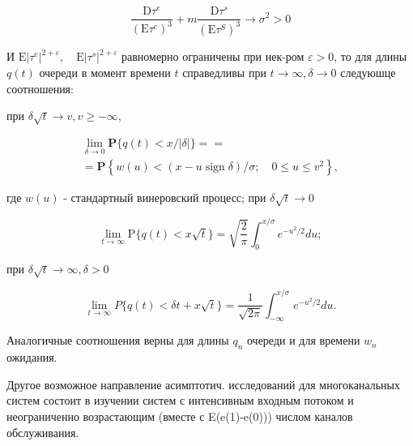 \documentclass[10pt]{article}
\begin{document}
\[

\frac{\mathrm{D} \tau^{e}}{\left(\mathrm{E} \tau^{e}\right)^{3}}+m \frac{\mathrm{D} \tau^{s}}{\left(\mathrm{E} \tau^{S}\right)^{3}} \longrightarrow \sigma^{2}>0

\]



И $\mathrm{E}\left|\tau^{e}\right|^{2+\varepsilon}, \quad \mathrm{E}\left|\tau^{s}\right|^{2+\varepsilon}$ равномерно ограничены при нек-ром $\varepsilon>0$, то для длины $q(t)$ очереди в момент времени $t$ справедливы при $t \rightarrow \infty, \delta \rightarrow 0$ следуюшце соотношения:



при $\delta \sqrt{t} \rightarrow v, v \geqslant-\infty$,



\[

\begin{gathered}

\lim _{\delta \rightarrow 0} \mathbf{P}\{q(t)<x /|\delta|\}== \\

=\mathbf{P}\left\{w(u)<(x-u \operatorname{sign} \delta) / \sigma ; \quad 0 \leqslant u \leqslant v^{2}\right\},

\end{gathered}

\]



где $w(u)$ - стандартный винеровский процесс; при $\delta \sqrt{t} \longrightarrow 0$



\[

\lim _{t \rightarrow \infty} \mathrm{P}\{q(t)<x \sqrt{t}\}=\sqrt{\frac{2}{\pi}} \int_{0}^{x / \sigma} e^{-u^{2} / 2} d u ;

\]



при $\delta \sqrt{t} \rightarrow \infty, \delta>0$



\[

\lim _{t \rightarrow \infty} P\{q(t)<\delta t+x \sqrt{t}\}=\frac{1}{\sqrt{2 \pi}} \int_{-\infty}^{x / \sigma} e^{-u^{2} / 2} d u .

\]



Аналогичные соотношения верны для длины $q_{n}$ очереди и для времени $w_{n}$ ожидания.



Другое возможное направление асимптотич. исследований для многоканальных систем состоит в изучении систем с интенсивным входным потоком и неограниченно возрастающим (вместе с E(e(1)-e(0))) числом каналов обслуживания.
\end{document}

